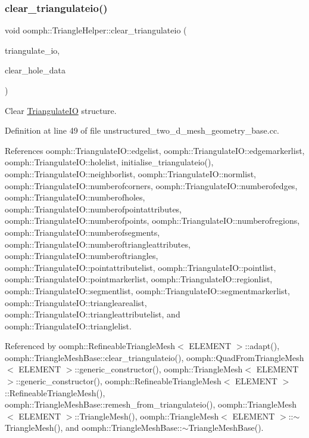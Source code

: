 \subsubsection{\texorpdfstring{clear\+\_\+triangulateio()}{clear\_triangulateio()}}
{\footnotesize\ttfamily void oomph\+::\+Triangle\+Helper\+::clear\+\_\+triangulateio (\begin{DoxyParamCaption}\item[{\hyperlink{structoomph_1_1TriangulateIO}{Triangulate\+IO} \&}]{triangulate\+\_\+io,  }\item[{const bool \&}]{clear\+\_\+hole\+\_\+data }\end{DoxyParamCaption})}



Clear \hyperlink{structoomph_1_1TriangulateIO}{Triangulate\+IO} structure. 



Definition at line 49 of file unstructured\+\_\+two\+\_\+d\+\_\+mesh\+\_\+geometry\+\_\+base.\+cc.



References oomph\+::\+Triangulate\+I\+O\+::edgelist, oomph\+::\+Triangulate\+I\+O\+::edgemarkerlist, oomph\+::\+Triangulate\+I\+O\+::holelist, initialise\+\_\+triangulateio(), oomph\+::\+Triangulate\+I\+O\+::neighborlist, oomph\+::\+Triangulate\+I\+O\+::normlist, oomph\+::\+Triangulate\+I\+O\+::numberofcorners, oomph\+::\+Triangulate\+I\+O\+::numberofedges, oomph\+::\+Triangulate\+I\+O\+::numberofholes, oomph\+::\+Triangulate\+I\+O\+::numberofpointattributes, oomph\+::\+Triangulate\+I\+O\+::numberofpoints, oomph\+::\+Triangulate\+I\+O\+::numberofregions, oomph\+::\+Triangulate\+I\+O\+::numberofsegments, oomph\+::\+Triangulate\+I\+O\+::numberoftriangleattributes, oomph\+::\+Triangulate\+I\+O\+::numberoftriangles, oomph\+::\+Triangulate\+I\+O\+::pointattributelist, oomph\+::\+Triangulate\+I\+O\+::pointlist, oomph\+::\+Triangulate\+I\+O\+::pointmarkerlist, oomph\+::\+Triangulate\+I\+O\+::regionlist, oomph\+::\+Triangulate\+I\+O\+::segmentlist, oomph\+::\+Triangulate\+I\+O\+::segmentmarkerlist, oomph\+::\+Triangulate\+I\+O\+::trianglearealist, oomph\+::\+Triangulate\+I\+O\+::triangleattributelist, and oomph\+::\+Triangulate\+I\+O\+::trianglelist.



Referenced by oomph\+::\+Refineable\+Triangle\+Mesh$<$ E\+L\+E\+M\+E\+N\+T $>$\+::adapt(), oomph\+::\+Triangle\+Mesh\+Base\+::clear\+\_\+triangulateio(), oomph\+::\+Quad\+From\+Triangle\+Mesh$<$ E\+L\+E\+M\+E\+N\+T $>$\+::generic\+\_\+constructor(), oomph\+::\+Triangle\+Mesh$<$ E\+L\+E\+M\+E\+N\+T $>$\+::generic\+\_\+constructor(), oomph\+::\+Refineable\+Triangle\+Mesh$<$ E\+L\+E\+M\+E\+N\+T $>$\+::\+Refineable\+Triangle\+Mesh(), oomph\+::\+Triangle\+Mesh\+Base\+::remesh\+\_\+from\+\_\+triangulateio(), oomph\+::\+Triangle\+Mesh$<$ E\+L\+E\+M\+E\+N\+T $>$\+::\+Triangle\+Mesh(), oomph\+::\+Triangle\+Mesh$<$ E\+L\+E\+M\+E\+N\+T $>$\+::$\sim$\+Triangle\+Mesh(), and oomph\+::\+Triangle\+Mesh\+Base\+::$\sim$\+Triangle\+Mesh\+Base().

